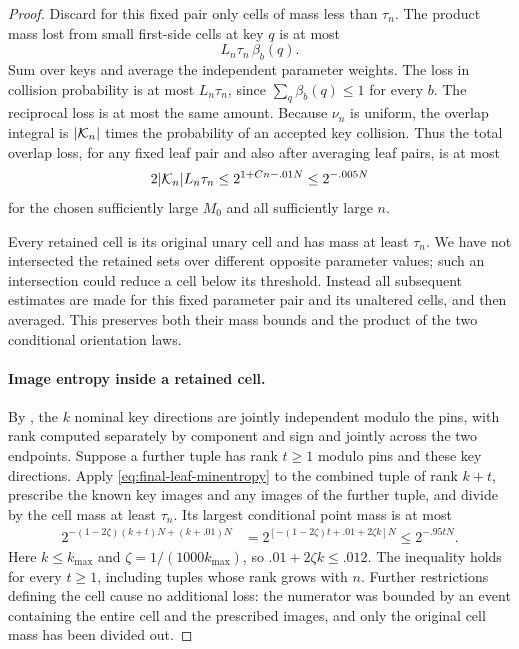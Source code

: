 \begin{proof}
Discard for this fixed pair only cells of mass less than
$\tau_n$.  The product mass lost from small first-side cells
at key $q$ is at most
\[
 L_n\tau_n\,\beta_b(q).
\]
Sum over keys and average the independent parameter weights.
The loss in collision probability is at most $L_n\tau_n$,
since $\sum_q\beta_b(q)\le1$ for every $b$.
The reciprocal loss is at most the same amount.
Because $\nu_n$ is uniform, the overlap integral is
$|\mathcal K_n|$ times the probability of an accepted key collision.
Thus the total overlap loss, for any fixed leaf pair and
also after averaging leaf pairs, is at most
\begin{equation}\label{eq:fubini-pruning}
 2|\mathcal K_n|L_n\tau_n
 \le 2^{1+Cn-.01N}
 \le 2^{-.005N}
\end{equation}
for the chosen sufficiently large $M_0$ and all sufficiently
large $n$.

Every retained cell is its original unary cell and has mass
at least $\tau_n$.  We have not intersected the retained
sets over different opposite parameter values; such an
intersection could reduce a cell below its threshold.
Instead all subsequent estimates are made for this fixed
parameter pair and its unaltered cells, and then averaged.
This preserves both their mass bounds and the product of
the two conditional orientation laws.

\paragraph{Image entropy inside a retained cell.}
By , the $k$ nominal key directions
are jointly independent modulo the pins, with rank computed
separately by component and sign and jointly across the two
endpoints.  Suppose a further tuple has rank $t\ge1$ modulo
pins and these key directions.  Apply
\eqref{eq:final-leaf-minentropy} to the combined tuple of
rank $k+t$, prescribe the known key images and any images
of the further tuple, and divide by the cell mass at least
$\tau_n$.  Its largest conditional point mass is at most
\begin{align}\label{eq:cell-pmax}
 2^{-(1-2\zeta)(k+t)N+(k+.01)N}
 &=2^{[-(1-2\zeta)t+.01+2\zeta k]N}
 \le2^{-.95tN}.
\end{align}
Here $k\le k_{\max}$ and
$\zeta=1/(1000k_{\max})$, so $.01+2\zeta k\le .012$.
The inequality holds for every $t\ge1$, including tuples
whose rank grows with $n$.  Further restrictions defining
the cell cause no additional loss: the numerator was bounded
by an event containing the entire cell and the prescribed
images, and only the original cell mass has been divided out.


\end{proof}
